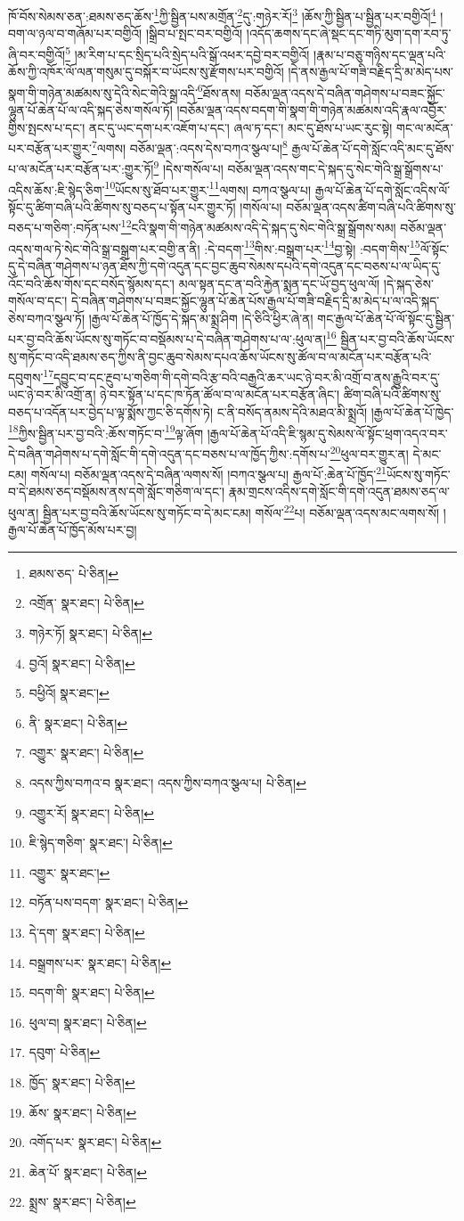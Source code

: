 ཁོ་བོས་སེམས་ཅན་:ཐམས་ཅད་ཆོས་\footnote{ཐམས་ཅད་  པེ་ཅིན། }ཀྱི་སྦྱིན་པས་མགྲོན་\footnote{འགྲོན་  སྣར་ཐང་།  པེ་ཅིན། }དུ་:གཉེར་རོ།\footnote{གཉེར་ཏོ།  སྣར་ཐང་།  པེ་ཅིན། } །ཆོས་ཀྱི་སྦྱིན་པ་སྦྱིན་པར་བགྱིའོ།\footnote{བྱའོ།  སྣར་ཐང་།  པེ་ཅིན། } །བག་ལ་ཉལ་བ་གཞོམ་པར་བགྱིའོ། །སྒྲིབ་པ་སྤང་བར་བགྱིའོ། །འདོད་ཆགས་དང་ཞེ་སྡང་དང་གཏི་མུག་དག་རབ་ཏུ་ཞི་བར་བགྱིའོ།\footnote{བཕྱིའོ།  སྣར་ཐང་། } །མ་རིག་པ་དང་སྲིད་པའི་སྲེད་པའི་སྒོ་འཕར་དབྱེ་བར་བགྱིའོ། །རྣམ་པ་བཅུ་གཉིས་དང་ལྡན་པའི་ཆོས་ཀྱི་འཁོར་ལོ་ལན་གསུམ་དུ་བསྐོར་བ་ཡོངས་སུ་རྫོགས་པར་བགྱིའོ། །དེ་ནས་རྒྱལ་པོ་གཟི་བརྗིད་དྲི་མ་མེད་པས་སྣག་གི་གཉེན་མཚམས་སུ་དེའི་སེང་གེའི་སྒྲ་འདི་\footnote{ནི་  སྣར་ཐང་།  པེ་ཅིན། }ཐོས་ནས། བཅོམ་ལྡན་འདས་དེ་བཞིན་གཤེགས་པ་བཟང་སྐྱོང་ལྷུན་པོ་ཆེན་པོ་ལ་འདི་སྐད་ཅེས་གསོལ་ཏོ། །བཅོམ་ལྡན་འདས་བདག་གི་སྣག་གི་གཉེན་མཚམས་འདི་རྣལ་འབྱོར་གྱིས་སྤངས་པ་དང་། ནང་དུ་ཡང་དག་པར་འཇོག་པ་དང་། ཞལ་ཏ་དང་། མང་དུ་ཐོས་པ་ཡང་རུང་སྟེ། གང་ལ་མངོན་པར་བརྩོན་པར་གྱུར་\footnote{འགྱུར་  སྣར་ཐང་།  པེ་ཅིན། }ལགས། བཅོམ་ལྡན་:འདས་དེས་བཀའ་སྩལ་པ།\footnote{འདས་ཀྱིས་བཀའ་བ  སྣར་ཐང་། འདས་ཀྱིས་བཀའ་སྩལ་པ།  པེ་ཅིན། } རྒྱལ་པོ་ཆེན་པོ་དགེ་སློང་འདི་མང་དུ་ཐོས་པ་ལ་མངོན་པར་བརྩོན་པར་:གྱུར་ཏོ།\footnote{འགྱུར་རོ།  སྣར་ཐང་།  པེ་ཅིན། } །དེས་གསོལ་པ། བཅོམ་ལྡན་འདས་གང་དེ་སྐད་དུ་སེང་གེའི་སྒྲ་སྒྲོགས་པ་འདིས་ཆོས་:ཇི་སྙེད་ཅིག་\footnote{ཇི་སྙེད་གཅིག་  སྣར་ཐང་།  པེ་ཅིན། }ཡོངས་སུ་ཐོབ་པར་གྱུར་\footnote{འགྱུར་  སྣར་ཐང་། }ལགས། བཀའ་སྩལ་པ། རྒྱལ་པོ་ཆེན་པོ་དགེ་སློང་འདིས་ལོ་སྟོང་དུ་ཚིག་བཞི་པའི་ཚིགས་སུ་བཅད་པ་སྟོན་པར་གྱུར་ཏོ། །གསོལ་པ། བཅོམ་ལྡན་འདས་ཚིག་བཞི་པའི་ཚིགས་སུ་བཅད་པ་གཅིག་:བཏོན་པས་\footnote{བཏོན་པས་བདག་  སྣར་ཐང་།  པེ་ཅིན། }ངའི་སྣག་གི་གཉེན་མཚམས་འདི་དེ་སྐད་དུ་སེང་གེའི་སྒྲ་སྒྲོགས་སམ། བཅོམ་ལྡན་འདས་གལ་ཏེ་སེང་གེའི་སྒྲ་བསྒྲག་པར་བགྱི་ན་ནི། :དེ་བདག་\footnote{དེ་དག་  སྣར་ཐང་།  པེ་ཅིན། }གིས་:བསྒྲག་པར་\footnote{བསྒྲགས་པར་  སྣར་ཐང་།  པེ་ཅིན། }བྱ་སྟེ། :བདག་གིས་\footnote{བདག་གི་  སྣར་ཐང་།  པེ་ཅིན། }ལོ་སྟོང་དུ་དེ་བཞིན་གཤེགས་པ་ཉན་ཐོས་ཀྱི་དགེ་འདུན་དང་བྱང་ཆུབ་སེམས་དཔའི་དགེ་འདུན་དང་བཅས་པ་ལ་ཡིད་དུ་འོང་བའི་ཆོས་གོས་དང་བསོད་སྙོམས་དང་། མལ་སྟན་དང་ན་བའི་རྐྱེན་སྨན་དང་ཡོ་བྱད་ཕུལ་ལོ། །དེ་སྐད་ཅེས་གསོལ་བ་དང་། དེ་བཞིན་གཤེགས་པ་བཟང་སྐྱོང་ལྷུན་པོ་ཆེན་པོས་རྒྱལ་པོ་གཟི་བརྗིད་དྲི་མ་མེད་པ་ལ་འདི་སྐད་ཅེས་བཀའ་སྩལ་ཏོ། །རྒྱལ་པོ་ཆེན་པོ་ཁྱོད་དེ་སྐད་མ་སྨྲ་ཤིག །དེ་ཅིའི་ཕྱིར་ཞེ་ན། གང་རྒྱལ་པོ་ཆེན་པོ་ལོ་སྟོང་དུ་སྦྱིན་པར་བྱ་བའི་ཆོས་ཡོངས་སུ་གཏོང་བ་བསྡོམས་པ་དེ་བཞིན་གཤེགས་པ་ལ་:ཕུལ་ན།\footnote{ཕུལ་བ།  སྣར་ཐང་།  པེ་ཅིན། } སྦྱིན་པར་བྱ་བའི་ཆོས་ཡོངས་སུ་གཏོང་བ་འདི་ཐམས་ཅད་ཀྱིས་ནི་བྱང་ཆུབ་སེམས་དཔའ་ཆོས་ཡོངས་སུ་ཚོལ་བ་ལ་མངོན་པར་བརྩོན་པའི་དབུགས་\footnote{དབུག་  པེ་ཅིན། }དབྱུང་བ་དང་རྔུབ་པ་གཅིག་གི་དགེ་བའི་རྩ་བའི་བརྒྱའི་ཆར་ཡང་ཉེ་བར་མི་འགྲོ་བ་ནས་རྒྱུའི་བར་དུ་ཡང་ཉེ་བར་མི་འགྲོ་ན། ཉེ་བར་སྟོན་པ་དང་ཁ་ཏོན་ཚོལ་བ་ལ་མངོན་པར་བརྩོན་ཞིང་། ཚིག་བཞི་པའི་ཚིགས་སུ་བཅད་པ་འདོན་པར་བྱེད་པ་ལྟ་སྨོས་ཀྱང་ཅི་དགོས་ཏེ། ང་ནི་བསོད་ནམས་དེའི་མཐའ་མི་སྨྲའོ། །རྒྱལ་པོ་ཆེན་པོ་ཁྱེད་\footnote{ཁྱོད་  སྣར་ཐང་།  པེ་ཅིན། }ཀྱིས་སྦྱིན་པར་བྱ་བའི་:ཆོས་གཏོང་བ་\footnote{ཆོས་  སྣར་ཐང་།  པེ་ཅིན། }ལྟ་ཞོག །རྒྱལ་པོ་ཆེན་པོ་འདི་ཇི་སྙམ་དུ་སེམས་ལོ་སྟོང་ཕྲག་འདའ་བར་དེ་བཞིན་གཤེགས་པ་དགེ་སློང་གི་དགེ་འདུན་དང་བཅས་པ་ལ་ཁྱོད་ཀྱིས་:དགོས་པ་\footnote{འགོད་པར་  སྣར་ཐང་།  པེ་ཅིན། }ཕུལ་བར་གྱུར་ན། དེ་མང་ངམ། གསོལ་པ། བཅོམ་ལྡན་འདས་དེ་བཞིན་ལགས་སོ། །བཀའ་སྩལ་པ། རྒྱལ་པོ་:ཆེན་པོ་ཁྱོད་\footnote{ཆེན་པོ་  སྣར་ཐང་།  པེ་ཅིན། }ཡོངས་སུ་གཏོང་བ་དེ་ཐམས་ཅད་བསྡོམས་ནས་དགེ་སློང་གཅིག་ལ་དང་། རྣམ་གྲངས་འདིས་དགེ་སློང་གི་དགེ་འདུན་ཐམས་ཅད་ལ་ཕུལ་ན། སྦྱིན་པར་བྱ་བའི་ཆོས་ཡོངས་སུ་གཏོང་བ་དེ་མང་ངམ། གསོལ་\footnote{སྨྲས་  སྣར་ཐང་།  པེ་ཅིན། }པ། བཅོམ་ལྡན་འདས་མང་ལགས་སོ། །རྒྱལ་པོ་ཆེན་པོ་ཁྱོད་མོས་པར་བྱ། 
